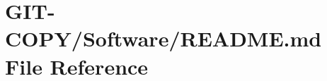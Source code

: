 \hypertarget{GIT-COPY_2Software_2README_8md}{}\section{G\+I\+T-\/\+C\+O\+P\+Y/\+Software/\+R\+E\+A\+D\+M\+E.md File Reference}
\label{GIT-COPY_2Software_2README_8md}
